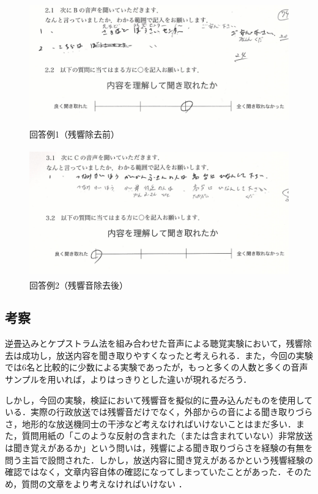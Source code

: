 \documentclass[a4j,11pt]{jsarticle}
\begin{document}
 
\begin{figure}[h]
\begin{center}
 \includegraphics[clip,width=130mm,height=55mm]{kaitourei1.pdf}
\end{center}
 \caption{回答例1（残響除去前）}
 \label{fig:kaitourei1}
\end{figure}

\begin{figure}[h]
\begin{center}
 \includegraphics[clip,width=130mm,height=55mm]{kaitourei2.pdf}
\end{center}
 \caption{回答例2（残響音除去後）}
 \label{fig:kaitourei2}
\end{figure}

\newpage

\subsection{考察}
逆畳込みとケプストラム法を組み合わせた音声による聴覚実験において，残響除去は成功し，放送内容を聞き取りやすくなったと考えられる．また，今回の実験では6名と比較的に少数による実験であったが，もっと多くの人数と多くの音声サンプルを用いれば，よりはっきりとした違いが現れるだろう．

しかし，今回の実験，検証において残響音を擬似的に畳み込んだものを使用している．実際の行政放送では残響音だけでなく，外部からの音による聞き取りづらさ，地形的な放送機同士の干渉など考えなければいけないことはまだ多い．また，質問用紙の「このような反射の含まれた（または含まれていない）非常放送は聞き覚えがあるか」という問いは，残響による聞き取りづらさを経験の有無を問う主旨で設問された．しかし，放送内容に聞き覚えがあるかという残響経験の確認ではなく，文章内容自体の確認になってしまっていたことがあった．そのため，質問の文章をより考えなければいけない
．
\end{document}
